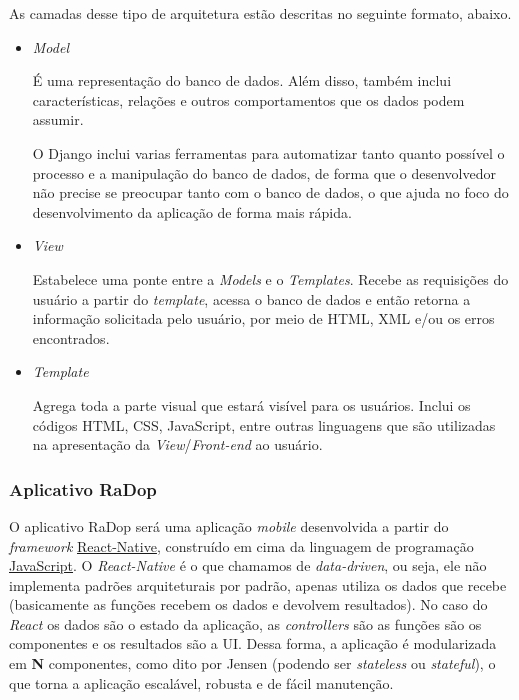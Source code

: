 As camadas desse tipo de arquitetura estão descritas no seguinte
formato, abaixo.

\begin{itemize}



\item{\emph{Model}}\label{model}

É uma representação do banco de dados. Além disso, também inclui
características, relações e outros comportamentos que os dados podem
assumir.

O Django inclui varias ferramentas para automatizar tanto quanto
possível o processo e a manipulação do banco de dados, de forma que o
desenvolvedor não precise se preocupar tanto com o banco de dados, o que
ajuda no foco do desenvolvimento da aplicação de forma mais rápida.

\item{\emph{View}}\label{view}

Estabelece uma ponte entre a \emph{Models} e o \emph{Templates}. Recebe
as requisições do usuário a partir do \emph{template}, acessa o banco de
dados e então retorna a informação solicitada pelo usuário, por meio de
HTML, XML e/ou os erros encontrados.

\item{\emph{Template}}\label{template}

Agrega toda a parte visual que estará visível para os usuários. Inclui
os códigos HTML, CSS, JavaScript, entre outras linguagens que são
utilizadas na apresentação da \emph{View}/\emph{Front-end} ao usuário.

\end{itemize}


\subsubsection{Aplicativo RaDop}\label{aplicativo-radop}

O aplicativo RaDop será uma aplicação \emph{mobile} desenvolvida a partir do
\emph{framework} \href{https://facebook.github.io/react-native/}{React-Native}, construído em cima da
linguagem de programação \href{https://www.javascript.com/}{JavaScript}. O
\emph{React-Native} é o que chamamos de \emph{data-driven}, ou seja, ele não
implementa padrões arquiteturais por padrão, apenas utiliza os dados que
recebe (basicamente as funções recebem os dados e devolvem resultados).
No caso do \emph{React} os dados são o estado da aplicação, as \emph{controllers} são
as funções são os componentes e os resultados são a UI. Dessa forma, a
aplicação é modularizada em \textbf{N} componentes, como dito por Jensen \cite{jensen2018} (podendo ser
\emph{stateless} ou \emph{stateful}), o que torna a aplicação escalável,
robusta e de fácil manutenção.

